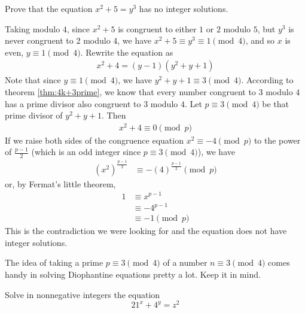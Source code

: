 \documentclass{subfile}
\begin{document}
				\begin{problem}
					Prove that the equation $x^2+5=y^3$ has no integer solutions.
				\end{problem}

				\begin{solution}
					Taking modulo $4$, since $x^2+5$ is congruent to either $1$ or $2$ modulo $5$, but $y^3$ is never congruent to $2$ modulo $4$, we have $x^2 + 5 \equiv y^3 \equiv 1 \pmod 4$, and so $x$ is even, $y \equiv 1 \pmod 4$. Rewrite the equation as
						\begin{align*}
							x^2+4 = (y-1)(y^2+y+1)
						\end{align*}
					Note that since $y \equiv 1 \pmod 4$, we have $y^2+y+1 \equiv 3 \pmod 4$. According to theorem \eqref{thm:4k+3prime}, we know that every number congruent to $3$ modulo $4$ has a prime divisor also congruent to $3$ modulo $4$. Let $p \equiv 3 \pmod 4$ be that prime divisor of $y^2+y+1$. Then
						\begin{align*}
							x^2 + 4 \equiv 0 \pmod p
						\end{align*}
					If we raise both sides of the congruence equation $x^2 \equiv -4 \pmod p$ to the power of $\frac{p-1}{2}$ (which is an odd integer since $p \equiv 3 \pmod 4$), we have
						\begin{align*}
							\left(x^2\right)^{\frac{p-1}{2}}
								& \equiv -\left(4\right)^{\frac{p-1}{2}} \pmod p
						\end{align*}
					or, by Fermat's little theorem,
						\begin{align*}
							1
								& \equiv x^{p-1}\\
								& \equiv -4^{p-1}\\
								& \equiv -1 \pmod p
						\end{align*}
					This is the contradiction we were looking for and the equation does not have integer solutions.
				\end{solution}

				\begin{note}
					The idea of taking a prime $p \equiv 3 \pmod 4$ of a number $n \equiv 3 \pmod 4$ comes handy in solving Diophantine equations pretty a lot. Keep it in mind.
				\end{note}

				\begin{problem}
					Solve in nonnegative integers the equation
					\[21^x+4^y=z^2\]
				\end{problem}
\end{document}

